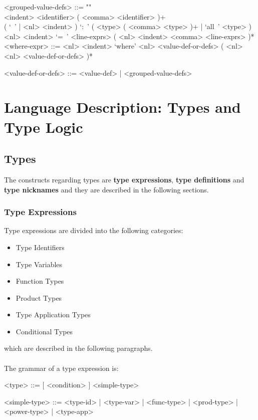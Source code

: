 \documentclass{article}
\begin{document}
\begin{grammar}
<grouped-value-defs> ::= ""\\
<indent> <identifier> ( <comma> <identifier> )+ \\
( `\ ' | <nl> <indent> ) `:\ ' ( <type> ( <comma> <type> )+ | `all\ ' <type> ) \\
<nl> <indent> `=\ ' <line-exprs> ( <nl> <indent> <comma> <line-exprs> )*
\\

<where-expr> ::=
<nl> <indent> `where' <nl> <value-def-or-defs> ( <nl> <nl> <value-def-or-defs> )*

<value-def-or-defs> ::= <value-def> | <grouped-value-defs> 
\end{grammar}

\section{Language Description: Types and Type Logic}

\subsection{Types}
\label{subsec:types}

The constructs regarding types are \textbf{type expressions}, \textbf{type
definitions} and \textbf{type nicknames} and they are described in the
following sections.

\subsubsection{Type Expressions}

Type expressions are divided into the following categories:
\begin{itemize}
\item Type Identifiers
\item Type Variables
\item Function Types
\item Product Types
\item Type Application Types
\item Conditional Types
\end{itemize}
which are described in the following paragraphs.
\\\\
The grammar of a type expression is:
\begin{grammar}
<type> ::= [ <condition> ]  <simple-type> 

<simple-type> ::=
<type-id> | <type-var> | <func-type> | <prod-type> | <power-type> | <type-app>
\\
\end{grammar}
\end{document}
